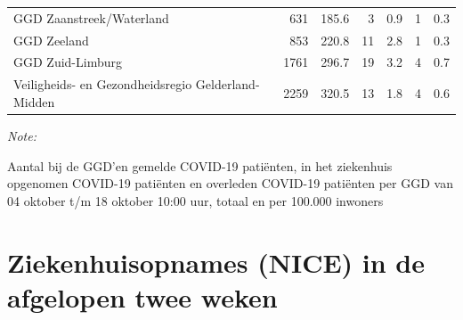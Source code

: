 \documentclass[
  english,
  man,floatsintext]{apa6}
\begin{document}
\begin{table}
\begin{threeparttable}
\begin{tabular}{lrrrrrr}
GGD Zaanstreek/Waterland & 631 & 185.6 & 3 & 0.9 & 1 & 0.3\\
GGD Zeeland & 853 & 220.8 & 11 & 2.8 & 1 & 0.3\\
GGD Zuid-Limburg & 1761 & 296.7 & 19 & 3.2 & 4 & 0.7\\
Veiligheids- en Gezondheidsregio Gelderland-Midden & 2259 & 320.5 & 13 & 1.8 & 4 & 0.6\\
\bottomrule
\end{tabular}
\begin{tablenotes}
\item \textit{Note: } 
\item Aantal bij de GGD’en gemelde COVID-19 patiënten, in het ziekenhuis opgenomen COVID-19 patiënten en overleden COVID-19 patiënten per GGD van 04 oktober t/m 18 oktober 10:00 uur, totaal en per 100.000 inwoners
\end{tablenotes}
\end{threeparttable}
\endgroup{}
\end{table}

\newpage

\hypertarget{ziekenhuisopnames-nice-in-de-afgelopen-twee-weken}{%
\section{Ziekenhuisopnames (NICE) in de afgelopen twee weken}\label{ziekenhuisopnames-nice-in-de-afgelopen-twee-weken}}
\end{document}
